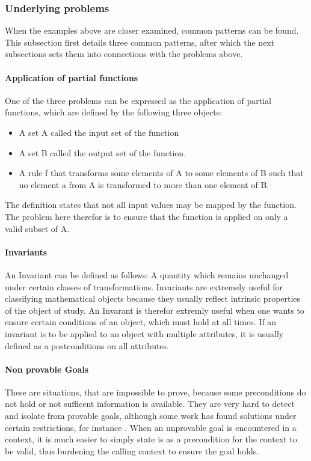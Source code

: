 \subsubsection{Underlying problems}
When the examples above are closer examined, common patterns can be found. This subsection first details three common patterns, after which the next subsections sets them into connections with the problems above.

\paragraph{Application of partial functions} \label{partial function}
One of the three problems can be expressed as the application of partial functions, which are defined by the following three objects:
\begin{itemize}
	\item A set A called the input set of the function
	\item A set B called the output set of the function.
	\item A rule f that transforms some elements of A to some elements of B such that no element a from A is transformed to more than one element of B.\cite[197]{khoussainov}
\end{itemize}
The definition states that not all input values may be mapped by the function. The problem here therefor is to ensure that the function is applied on only a valid subset of A.


\paragraph{Invariants} \label{invariants}
An Invariant can be defined as follows: A quantity which remains unchanged under certain classes of transformations. Invariants are extremely useful for classifying mathematical objects because they usually reflect intrinsic properties of the object of study.\cite[282ff]{hunt}
\newline An Invarant is therefor extremly useful when one wants to ensure certain conditions of an object, which must hold at all times. If an invariant is to be applied to an object with multiple attributes, it is usually defined as a postconditions on all attributes. 

\paragraph{Non provable Goals} \label{non provable goal}
These are situations, that are impossible to prove, because some preconditions do not hold or not sufficent information is available. They are very hard to detect and isolate from provable goals, although some work has found solutions under certain restrictions, for instance \cite{goals}. When an unprovable goal is encountered in a context, it is much easier to simply state is as a precondition for the context to be valid, thus burdening the calling context to ensure the goal holds. 

